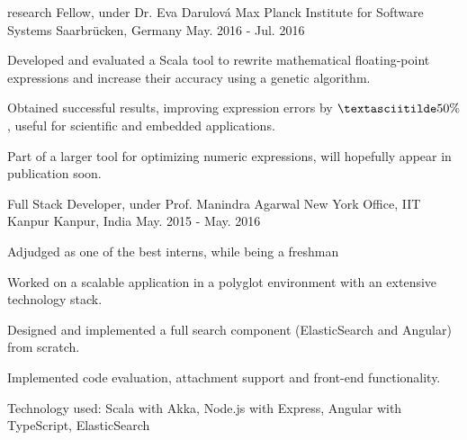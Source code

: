 


\begin{cventries}


  \cventry
  {research Fellow, under Dr. Eva Darulová} %
  {Max Planck Institute for Software Systems} %
  {Saarbrücken, Germany} %
  {May. 2016 - Jul. 2016} %
  {
    \begin{cvitems}
    \item {Developed and evaluated a Scala tool to rewrite
    mathematical floating-point expressions and increase their
    accuracy using a genetic algorithm.}
    \item {Obtained successful results, improving expression errors by
    $\textasciitilde50\%$, useful for scientific and embedded
    applications.}
    \item {Part of a larger tool for optimizing numeric expressions,
        will hopefully appear in publication soon.}
    \end{cvitems}
  }

  \cventry
  {Full Stack Developer, under Prof. Manindra Agarwal}
  {New York Office, IIT Kanpur}
  {Kanpur, India}
  {May. 2015 - May. 2016}
  {
    \begin{cvitems}
    \item Adjudged as one of the best interns, while being a freshman
    \item Worked on a scalable application in a polyglot environment
      with an extensive technology stack.
    \item Designed and implemented a full search component
      (ElasticSearch and Angular) from scratch.
    \item Implemented code evaluation, attachment support and
      front-end functionality.
    \item Technology used: Scala with Akka, Node.js with Express,
      Angular with TypeScript, ElasticSearch
    \end{cvitems}
  }

\end{cventries}

